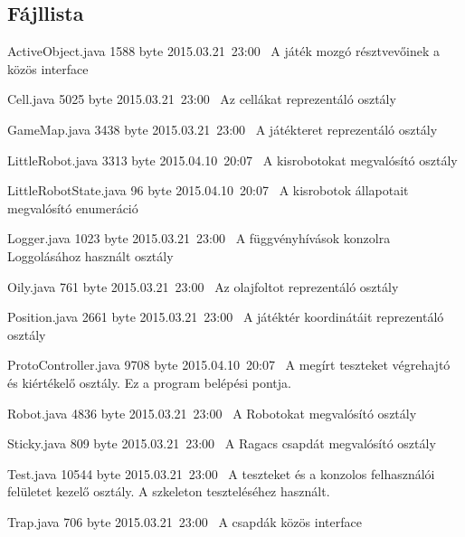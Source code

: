 \subsection{Fájllista}

\begin{fajllista}

\fajl
{ActiveObject.java} %
{1588 byte} %
{2015.03.21~23:00~} %
{A játék mozgó résztvevőinek a közös interface} %

\fajl
{Cell.java} %
{5025 byte} %
{2015.03.21~23:00~} %
{Az cellákat reprezentáló osztály} %

\fajl
{GameMap.java} %
{3438 byte} %
{2015.03.21~23:00~} %
{A játékteret reprezentáló osztály} %

\fajl
{LittleRobot.java}
{3313 byte}
{2015.04.10~20:07~}
{A kisrobotokat megvalósító osztály}

\fajl
{LittleRobotState.java}
{96 byte}
{2015.04.10~20:07~}
{A kisrobotok állapotait megvalósító enumeráció}

\fajl
{Logger.java} %
{1023 byte} %
{2015.03.21~23:00~} %
{A függvényhívások konzolra Loggolásához használt osztály} %

\fajl
{Oily.java} %
{761 byte} %
{2015.03.21~23:00~} %
{Az olajfoltot reprezentáló osztály} %

\fajl
{Position.java} %
{2661 byte} %
{2015.03.21~23:00~} %
{A játéktér koordinátáit reprezentáló osztály} %

\fajl
{ProtoController.java}
{9708 byte}
{2015.04.10~20:07~}
{A megírt teszteket végrehajtó és kiértékelő osztály. Ez a program belépési pontja.}

\fajl
{Robot.java} %
{4836 byte} %
{2015.03.21~23:00~} %
{A Robotokat megvalósító osztály} %

\fajl
{Sticky.java} %
{809 byte} %
{2015.03.21~23:00~} %
{A Ragacs csapdát megvalósító osztály} %

\fajl
{Test.java} %
{10544 byte} %
{2015.03.21~23:00~} %
{A teszteket és a konzolos felhasználói felületet kezelő osztály. A szkeleton teszteléséhez használt.} %

\fajl
{Trap.java} %
{706 byte} %
{2015.03.21~23:00~} %
{A csapdák közös interface} %

\end{fajllista}

